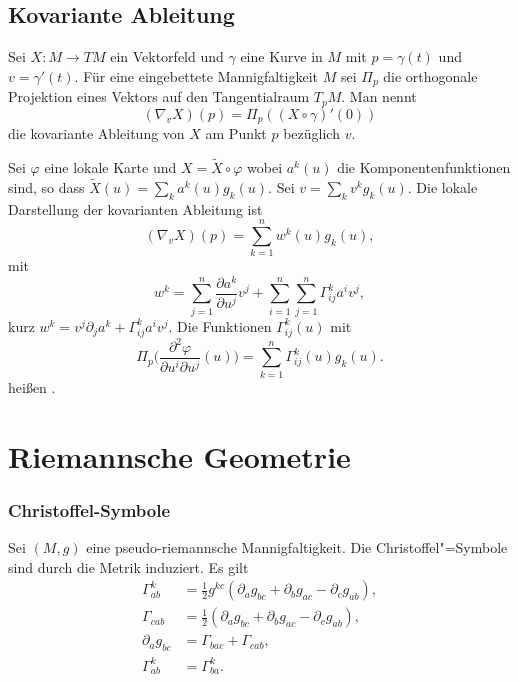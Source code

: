 \subsection{Kovariante Ableitung}
\begin{definition}\mbox{}\newline
Sei $X\colon M\to TM$ ein Vektorfeld und $\gamma$ eine Kurve
in $M$ mit $p=\gamma(t)$ und $v=\gamma'(t)$. Für eine eingebettete
Mannigfaltigkeit $M$ sei $\Pi_p$ die orthogonale Projektion eines Vektors
auf den Tangentialraum $T_p M$. Man nennt%
\begin{equation}
(\nabla_v X)(p) = \Pi_p((X\circ\gamma)'(0))
\end{equation}
die kovariante Ableitung von $X$ am Punkt $p$ bezüglich $v$.
\end{definition}
Sei $\varphi$ eine lokale Karte und $X=\tilde X\circ\varphi$ wobei
$a^k(u)$ die Komponentenfunktionen sind, so dass
$\tilde X(u) = \sum_k a^k(u) g_k(u)$. Sei $v=\sum_k v^k g_k(u)$.
Die lokale Darstellung der kovarianten Ableitung ist
\begin{equation}
(\nabla_v X)(p) = \sum_{k=1}^n w^k(u) g_k(u),
\end{equation}
mit
\begin{equation}
w^k = \sum_{j=1}^n \frac{\partial a^k}{\partial u^j}v^j
+ \sum_{i=1}^n\sum_{j=1}^n \Gamma_{ij}^k a^i v^j,
\end{equation}
kurz $w^k = v^j\partial_j a^k + \Gamma_{ij}^k a^i v^j$. Die
Funktionen $\Gamma_{ij}^k(u)$ mit%
\begin{equation}
\Pi_p\Big(\frac{\partial^2\varphi}{\partial u^i\partial u^j}(u)\Big)
= \sum_{k=1}^n\Gamma_{ij}^k(u) g_k(u).
\end{equation}
heißen .

\section{Riemannsche Geometrie}
\subsubsection{Christoffel-Symbole}
Sei $(M,g)$ eine pseudo-riemannsche Mannigfaltigkeit. Die
Christoffel"=Symbole sind durch die Metrik induziert. Es gilt%
\begin{align}
\Gamma_{ab}^k &= \frac{1}{2} g^{kc}
(\partial_a g_{bc}+\partial_b g_{ac}-\partial_c g_{ab}),\\
\Gamma_{cab} &= \frac{1}{2}
(\partial_a g_{bc}+\partial_b g_{ac}-\partial_c g_{ab}),\\
\partial_a g_{bc} &= \Gamma_{bac}+\Gamma_{cab},\\
\Gamma_{ab}^k &= \Gamma_{ba}^k.
\end{align}



